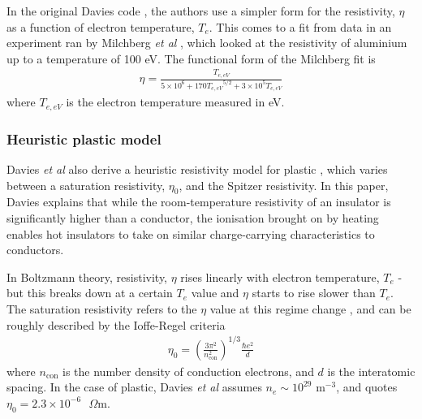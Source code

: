 \documentclass[12pt]{article}
\numberwithin{equation}{section}
\begin{document}
In the original Davies code \cite{hybrid:Davies:2002}, the authors use a simpler form for the resistivity, $\eta$ as a function of electron temperature, $T_e$. This comes to a fit from data in an experiment ran by Milchberg \textit{et al} \cite{eta:Al:Milchberg}, which looked at the resistivity of aluminium up to a temperature of 100 eV. The functional form of the Milchberg fit is
%
\begin{align}
  \eta = \frac{T_{e,eV}}{5\times 10^6 + 170 {T_{e,eV}}^{5/2} + 3\times 10^5 T_{e,eV}}
\end{align}
%
where $T_{e,eV}$ is the electron temperature measured in eV.

\subsubsection{Heuristic plastic model} \label{sec:code:res:plastic}

Davies \textit{et al} also derive a heuristic resistivity model for plastic \cite{eta:Davies}, which varies between a saturation resistivity, $\eta_0$, and the Spitzer resistivity. In this paper, Davies explains that while the room-temperature resistivity of an insulator is significantly higher than a conductor, the ionisation brought on by heating enables hot insulators to take on similar charge-carrying characteristics to conductors.

In Boltzmann theory, resistivity, $\eta$ rises linearly with electron temperature, $T_e$ - but this breaks down at a certain $T_e$ value and $\eta$ starts to rise slower than $T_e$. The saturation resistivity refers to the $\eta$ value at this regime change \cite{eta:saturation:Gunnarsson}, and can be roughly described by the Ioffe-Regel criteria
%
\begin{align}
  \eta_0 = \left(\frac{3\pi^2}{n_\text{con}^2}\right)^{1/3}\frac{\hbar e^2}{d}
\end{align}
%
where $n_\text{con}$ is the number density of conduction electrons, and $d$ is the interatomic spacing. In the case of plastic, Davies \textit{et al} assumes $n_e \sim 10^{29} \text{ m}^{-3}$, and quotes $\eta_0 = 2.3\times 10^{-6} \text{ }\Omega \text{m}$.
\end{document}
